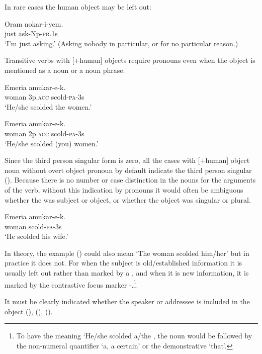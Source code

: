 In rare cases the human object may be left out:

\ea%
\label{ex:x553}
\gll Oram nokar-i-yem. \\
just ask-Np-\textsc{pr}.1s\\
\glt`I'm just asking.' (Asking nobody in particular, or for no particular reason.)
\z

Transitive verbs with [+human] objects require pronouns even when the object is mentioned as a noun or a noun phrase.

\ea%
\label{ex:x554}
\gll Emeria  amukar-e-k. \\
woman 3p.\textsc{acc} scold-\textsc{pa}-3s\\
\glt`He/she scolded the women.'
\z

\ea%
\label{ex:x555}
\gll Emeria  amukar-e-k. \\
woman 2p.\textsc{acc} scold-\textsc{pa}-3s\\
\glt`He/she scolded (you) women.'
\z

Since the third person singular form is zero, all the cases with [+human] object noun without overt object pronoun by default indicate the third person singular (). Because there is no number or case distinction in the nouns for the arguments of the verb, without this indication by pronouns it would often be ambiguous whether the  was subject or object, or whether the object was singular or plural. 

\ea%
\label{ex:x556}
\gll Emeria amukar-e-k. \\
woman scold-\textsc{pa}-3s\\
\glt`He scolded his wife.'
\z

In theory, the example () could also mean `The woman scolded him/her' but in practice it does not. For when the subject is old/established information it is usually left out rather than marked by a , and when it is new information, it is marked by the contrastive focus marker -.\footnote{To have the meaning `He/she scolded a/the , the noun would be followed by the non-numeral quantifier  `a, a certain' or the demonstrative  `that'.}

It must be clearly indicated whether the speaker or addressee is included in the object (), (), ().

